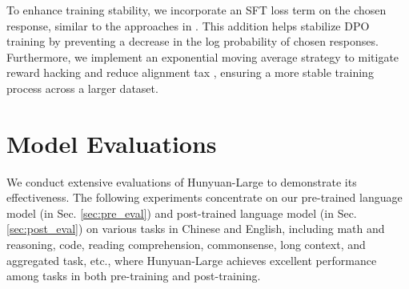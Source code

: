 \documentclass{article}
\begin{document}
To enhance training stability, we incorporate an SFT loss term on the chosen response, similar to the approaches in \citep{dubey2024llama, adler2024nemotron}. This addition helps stabilize DPO training by preventing a decrease in the log probability of chosen responses.
Furthermore, we implement an exponential moving average strategy to mitigate reward hacking and reduce alignment tax \citep{ouyang2022training}, ensuring a more stable training process across a larger dataset.

\section{Model Evaluations} 
\label{sec:evaluation}

We conduct extensive evaluations of Hunyuan-Large to demonstrate its effectiveness. The following experiments concentrate on our pre-trained language model (in Sec. \ref{sec:pre_eval}) and post-trained language model (in Sec. \ref{sec:post_eval}) on various tasks in Chinese and English, including math and reasoning, code, reading comprehension, commonsense, long context, and aggregated task, etc., where Hunyuan-Large achieves excellent performance among tasks in both pre-training and post-training. 
\end{document}
